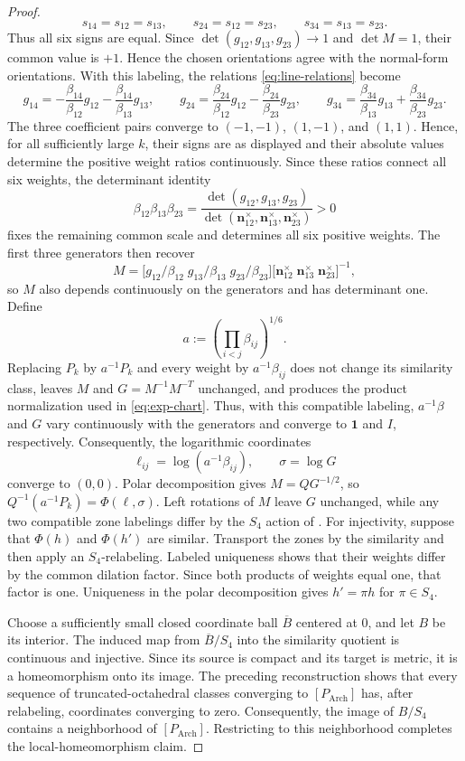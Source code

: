 \documentclass[11pt]{article}
\newcommand{\Arch}{P_{\mathrm{Arch}}}
\newcommand{\mb}[1]{\mathbf{#1}}
\theoremstyle{remark}
\begin{document}
\begin{proof}
\[
s_{14}=s_{12}=s_{13},\qquad
s_{24}=s_{12}=s_{23},\qquad
s_{34}=s_{13}=s_{23}.
\]
Thus all six signs are equal.  Since
$\det(g_{12},g_{13},g_{23})\to1$ and $\det M=1$, their common value is
$+1$.  Hence the chosen orientations agree with the normal-form
orientations.
With this labeling, the relations \eqref{eq:line-relations} become
\[
g_{14}=-\frac{\beta_{14}}{\beta_{12}}g_{12}
        -\frac{\beta_{14}}{\beta_{13}}g_{13},\qquad
g_{24}= \frac{\beta_{24}}{\beta_{12}}g_{12}
        -\frac{\beta_{24}}{\beta_{23}}g_{23},\qquad
g_{34}= \frac{\beta_{34}}{\beta_{13}}g_{13}
        +\frac{\beta_{34}}{\beta_{23}}g_{23}.
\]
The three coefficient pairs converge to $(-1,-1)$, $(1,-1)$, and $(1,1)$.  Hence,
for all sufficiently large $k$, their signs are as displayed and their absolute values
determine the positive weight ratios continuously.  Since these ratios connect all six
weights, the determinant identity
\[
 \beta_{12}\beta_{13}\beta_{23}
 =\frac{\det(g_{12},g_{13},g_{23})}
        {\det(\mb n_{12}^{\times},\mb n_{13}^{\times},\mb n_{23}^{\times})}>0
\]
fixes the remaining common scale and determines all six positive weights.  
The first three generators
then recover
\[
 M=\bigl[g_{12}/\beta_{12}\;g_{13}/\beta_{13}\;g_{23}/\beta_{23}\bigr]
   \bigl[\mb n_{12}^{\times}\;\mb n_{13}^{\times}\;\mb n_{23}^{\times}\bigr]^{-1},
\]
so $M$ also depends continuously on the generators and has determinant one.  Define
\[
 a:=\left(\prod_{i<j}\beta_{ij}\right)^{1/6}.
\]
Replacing $P_k$ by $a^{-1}P_k$ and every weight by $a^{-1}\beta_{ij}$
does not change its similarity class, leaves $M$ and $G=M^{-1}M^{-T}$ unchanged, and
produces the product normalization used in \eqref{eq:exp-chart}.  Thus, with this compatible
labeling, $a^{-1}\beta$ and $G$ vary continuously with the generators and converge to
$\mb{1}$ and $I$, respectively.  Consequently, the logarithmic coordinates
\[
 \ell_{ij}=\log(a^{-1}\beta_{ij}),\qquad \sigma=\log G
\]
converge to $(0,0)$.
Polar decomposition gives $M=QG^{-1/2}$, so
$Q^{-1}(a^{-1}P_k)=\Phi(\ell,\sigma)$.  Left rotations of $M$ leave $G$ unchanged,
while any two compatible zone labelings differ by the $S_4$ action of
.  For injectivity, suppose that $\Phi(h)$ and $\Phi(h')$ are similar.
Transport the zones by the similarity and then apply an $S_4$-relabeling.  Labeled uniqueness shows that their weights differ by the common dilation factor.  
Since both products of weights equal one, that factor is one.  Uniqueness in the polar decomposition gives $h'=\pi h$ for $\pi\in S_4$.

Choose a sufficiently small closed coordinate ball $\overline B$ centered at $0$, and let $B$ be its
interior.  The induced map from
$\overline B/S_4$ into the similarity quotient is continuous and injective.  Since its
source is compact and its target is metric, it is a homeomorphism onto its image.  The
preceding reconstruction shows that every sequence of truncated-octahedral classes
converging to $[\Arch]$ has, after relabeling, coordinates converging to zero.  Consequently, the image of
$B/S_4$ contains a neighborhood of $[\Arch]$.  Restricting to this neighborhood completes
the local-homeomorphism claim.
\end{proof}
\end{document}
